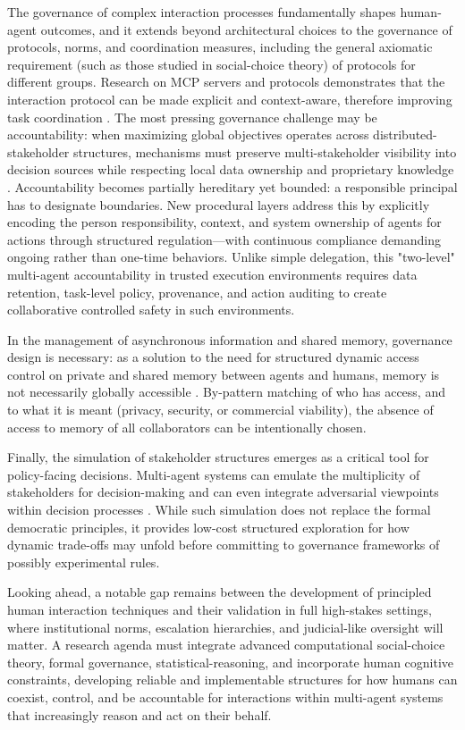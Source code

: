 \documentclass[11pt,a4paper]{article}
\begin{document}
The governance of complex interaction processes fundamentally shapes human-agent outcomes, and it extends beyond architectural choices to the governance of protocols, norms, and coordination measures, including the general axiomatic requirement (such as those studied in social-choice theory) of protocols for different groups. Research on MCP servers and protocols demonstrates that the interaction protocol can be made explicit and context-aware, therefore improving task coordination \cite{arxiv:2601.11595v2,arxiv:2505.06416v1}. The most pressing governance challenge may be accountability: when maximizing global objectives operates across distributed-stakeholder structures, mechanisms must preserve multi-stakeholder visibility into decision sources while respecting local data ownership and proprietary knowledge \cite{arxiv:2411.14033v2}. Accountability becomes partially hereditary yet bounded: a responsible principal has to designate boundaries. New procedural layers address this by explicitly encoding the person responsibility, context, and system ownership of agents for actions through structured regulation---with continuous compliance demanding ongoing rather than one-time behaviors. Unlike simple delegation, this "two-level" multi-agent accountability in trusted execution environments requires data retention, task-level policy, provenance, and action auditing to create collaborative controlled safety in such environments.

In the management of asynchronous information and shared memory, governance design is necessary: as a solution to the need for structured dynamic access control on private and shared memory between agents and humans, memory is not necessarily globally accessible \cite{arxiv:2505.18279v1}. By-pattern matching of who has access, and to what it is meant (privacy, security, or commercial viability), the absence of access to memory of all collaborators can be intentionally chosen.

Finally, the simulation of stakeholder structures emerges as a critical tool for policy-facing decisions. Multi-agent systems can emulate the multiplicity of stakeholders for decision-making and can even integrate adversarial viewpoints within decision processes \cite{arxiv:2510.05174v4}. While such simulation does not replace the formal democratic principles, it provides low-cost structured exploration for how dynamic trade-offs may unfold before committing to governance frameworks of possibly experimental rules.

Looking ahead, a notable gap remains between the development of principled human interaction techniques and their validation in full high-stakes settings, where institutional norms, escalation hierarchies, and judicial-like oversight will matter. A research agenda must integrate advanced computational social-choice theory, formal governance, statistical-reasoning, and incorporate human cognitive constraints, developing reliable and implementable structures for how humans can coexist, control, and be accountable for interactions within multi-agent systems that increasingly reason and act on their behalf.
\end{document}
